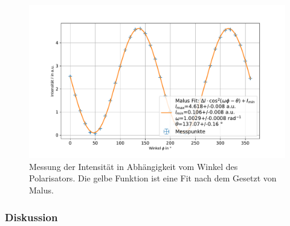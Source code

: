 \documentclass[
	a4paper,
	12pt,
	pagesize,
	ngerman
]{scrartcl}
\begin{document}
	\begin{figure}[H]
			\includegraphics[width=0.8\linewidth]{img/malus}
			\caption{
			Messung der Intensität in Abhängigkeit vom Winkel des Polarisators.
			Die gelbe Funktion ist eine Fit nach dem Gesetzt von Malus.
			}
			\label{fig_malus}
	\end{figure}




			\subsubsection*{Diskussion}

\end{document}
